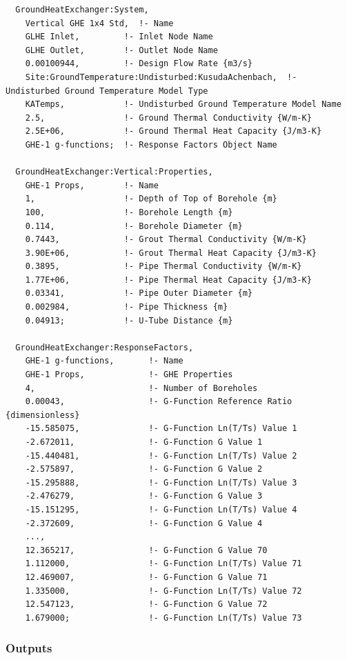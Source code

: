 \begin{lstlisting}
  GroundHeatExchanger:System,
    Vertical GHE 1x4 Std,  !- Name
    GLHE Inlet,         !- Inlet Node Name
    GLHE Outlet,        !- Outlet Node Name
    0.00100944,         !- Design Flow Rate {m3/s}
    Site:GroundTemperature:Undisturbed:KusudaAchenbach,  !- Undisturbed Ground Temperature Model Type
    KATemps,            !- Undisturbed Ground Temperature Model Name
    2.5,                !- Ground Thermal Conductivity {W/m-K}
    2.5E+06,            !- Ground Thermal Heat Capacity {J/m3-K}
    GHE-1 g-functions;  !- Response Factors Object Name

  GroundHeatExchanger:Vertical:Properties,
    GHE-1 Props,        !- Name
    1,                  !- Depth of Top of Borehole {m}
    100,                !- Borehole Length {m}
    0.114,              !- Borehole Diameter {m}
    0.7443,             !- Grout Thermal Conductivity {W/m-K}
    3.90E+06,           !- Grout Thermal Heat Capacity {J/m3-K}
    0.3895,             !- Pipe Thermal Conductivity {W/m-K}
    1.77E+06,           !- Pipe Thermal Heat Capacity {J/m3-K}
    0.03341,            !- Pipe Outer Diameter {m}
    0.002984,           !- Pipe Thickness {m}
    0.04913;            !- U-Tube Distance {m}

  GroundHeatExchanger:ResponseFactors,
    GHE-1 g-functions,       !- Name
    GHE-1 Props,             !- GHE Properties
    4,                       !- Number of Boreholes
    0.00043,                 !- G-Function Reference Ratio {dimensionless}
    -15.585075,              !- G-Function Ln(T/Ts) Value 1
    -2.672011,               !- G-Function G Value 1
    -15.440481,              !- G-Function Ln(T/Ts) Value 2
    -2.575897,               !- G-Function G Value 2
    -15.295888,              !- G-Function Ln(T/Ts) Value 3
    -2.476279,               !- G-Function G Value 3
    -15.151295,              !- G-Function Ln(T/Ts) Value 4
    -2.372609,               !- G-Function G Value 4
    ...,
    12.365217,               !- G-Function G Value 70
    1.112000,                !- G-Function Ln(T/Ts) Value 71
    12.469007,               !- G-Function G Value 71
    1.335000,                !- G-Function Ln(T/Ts) Value 72
    12.547123,               !- G-Function G Value 72
    1.679000;                !- G-Function Ln(T/Ts) Value 73
\end{lstlisting}

\subsubsection{Outputs}\label{outputs-10-000}

